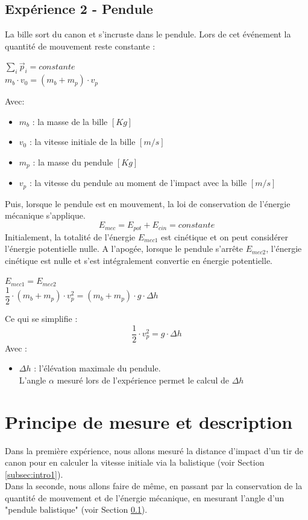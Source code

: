 \documentclass[11pt]{article}
\begin{document}
\subsection{Expérience 2 - Pendule} \label{subsec:intro2}
La bille sort du canon et s'incruste dans le pendule. Lors de cet événement la quantité de mouvement reste constante : \begin{center}
$\sum\limits_{i}\vec{p}_i=constante$\\
$m_b \cdot v_0=(m_b+m_p) \cdot v_p$
\end{center} Avec:
\begin{itemize}
 \item $m_b$ : la masse de la bille $[Kg]$
 \item $v_0$ : la vitesse initiale de la bille $[m/s]$
 \item $m_p$ : la masse du pendule $[Kg]$
 \item $v_p$ : la vitesse du pendule au moment de l'impact avec la bille $[m/s]$
\end{itemize}
Puis, lorsque le pendule est en mouvement, la loi de conservation de l'énergie mécanique s'applique.$$E_{mec}=E_{pot}+E_{cin}=constante$$ Initialement, la totalité de l'énergie $E_{mec1}$ est cinétique et on peut considérer l'énergie potentielle nulle. A l'apogée, lorsque le pendule s'arrête $E_{mec2}$, l'énergie cinétique est nulle et s'est intégralement convertie en énergie potentielle. \begin{center}
$E_{mec1}=E_{mec2}$\\
$\dfrac{1}{2} \cdot (m_b+m_p) \cdot v_p^2=(m_b+m_p)\cdot g \cdot \Delta h$
\end{center} Ce qui se simplifie : $$\dfrac{1}{2} \cdot v_p^2=g \cdot \Delta h$$ Avec : 
\begin{itemize}
 \item $\Delta h$ : l'élévation maximale du pendule.\\ L'angle $\alpha$ mesuré lors de l'expérience permet le calcul de $\Delta h$ 
\end{itemize}

\section{Principe de mesure et description}
Dans la première expérience, nous allons mesuré la distance d'impact d'un tir de canon pour en calculer la vitesse initiale via la balistique (voir Section \ref{subsec:intro1}). \\
Dans la seconde, nous allons faire de même, en passant par la conservation de la quantité de mouvement et de l'énergie mécanique, en mesurant l'angle d'un "pendule balistique" (voir Section \ref{subsec:intro2}).
\end{document}
